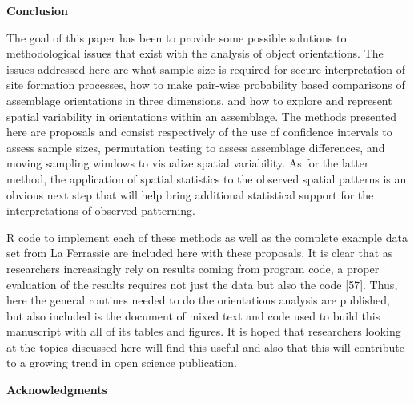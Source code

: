 \documentclass[]{article}
\begin{document}
\textbf{Conclusion}

The goal of this paper has been to provide some possible solutions to
methodological issues that exist with the analysis of object
orientations. The issues addressed here are what sample size is required
for secure interpretation of site formation processes, how to make
pair-wise probability based comparisons of assemblage orientations in
three dimensions, and how to explore and represent spatial variability
in orientations within an assemblage. The methods presented here are
proposals and consist respectively of the use of confidence intervals to
assess sample sizes, permutation testing to assess assemblage
differences, and moving sampling windows to visualize spatial
variability. As for the latter method, the application of spatial
statistics to the observed spatial patterns is an obvious next step that
will help bring additional statistical support for the interpretations
of observed patterning.

R code to implement each of these methods as well as the complete
example data set from La Ferrassie are included here with these
proposals. It is clear that as researchers increasingly rely on results
coming from program code, a proper evaluation of the results requires
not just the data but also the code {[}57{]}. Thus, here the general
routines needed to do the orientations analysis are published, but also
included is the document of mixed text and code used to build this
manuscript with all of its tables and figures. It is hoped that
researchers looking at the topics discussed here will find this useful
and also that this will contribute to a growing trend in open science
publication.

\textbf{Acknowledgments}
\end{document}
